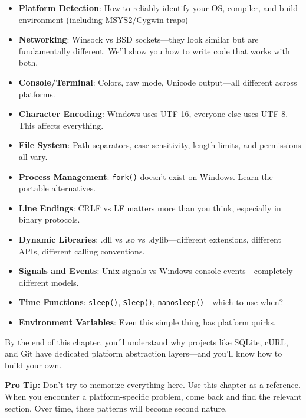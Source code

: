\begin{itemize}
    \item \textbf{Platform Detection}: How to reliably identify your OS, compiler, and build environment (including MSYS2/Cygwin traps)

    \item \textbf{Networking}: Winsock vs BSD sockets---they look similar but are fundamentally different. We'll show you how to write code that works with both.

    \item \textbf{Console/Terminal}: Colors, raw mode, Unicode output---all different across platforms.

    \item \textbf{Character Encoding}: Windows uses UTF-16, everyone else uses UTF-8. This affects everything.

    \item \textbf{File System}: Path separators, case sensitivity, length limits, and permissions all vary.

    \item \textbf{Process Management}: \texttt{fork()} doesn't exist on Windows. Learn the portable alternatives.

    \item \textbf{Line Endings}: CRLF vs LF matters more than you think, especially in binary protocols.

    \item \textbf{Dynamic Libraries}: .dll vs .so vs .dylib---different extensions, different APIs, different calling conventions.

    \item \textbf{Signals and Events}: Unix signals vs Windows console events---completely different models.

    \item \textbf{Time Functions}: \texttt{sleep()}, \texttt{Sleep()}, \texttt{nanosleep()}---which to use when?

    \item \textbf{Environment Variables}: Even this simple thing has platform quirks.
\end{itemize}

By the end of this chapter, you'll understand why projects like SQLite, cURL, and Git have dedicated platform abstraction layers---and you'll know how to build your own.

\begin{tipbox}
\textbf{Pro Tip:} Don't try to memorize everything here. Use this chapter as a reference. When you encounter a platform-specific problem, come back and find the relevant section. Over time, these patterns will become second nature.
\end{tipbox}

